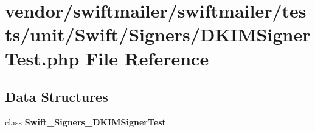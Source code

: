 \section{vendor/swiftmailer/swiftmailer/tests/unit/\+Swift/\+Signers/\+D\+K\+I\+M\+Signer\+Test.php File Reference}
\label{_d_k_i_m_signer_test_8php}
\subsection*{Data Structures}
\begin{DoxyCompactItemize}
\item 
class {\bf Swift\+\_\+\+Signers\+\_\+\+D\+K\+I\+M\+Signer\+Test}
\end{DoxyCompactItemize}
